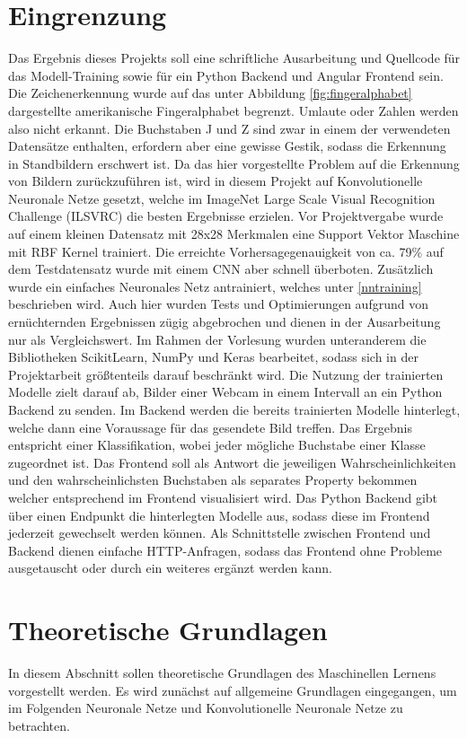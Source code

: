 \documentclass[11pt,bibliography=totocnumbered]{scrartcl}
\begin{document}
\section{Eingrenzung}
Das Ergebnis dieses Projekts soll eine schriftliche Ausarbeitung und Quellcode für das Modell-Training sowie für ein Python Backend und Angular Frontend sein. Die Zeichenerkennung wurde auf das unter Abbildung \ref{fig:fingeralphabet} dargestellte amerikanische Fingeralphabet begrenzt. Umlaute oder Zahlen werden also nicht erkannt. Die Buchstaben J und Z sind zwar in einem der verwendeten Datensätze enthalten, erfordern aber eine gewisse Gestik, sodass die Erkennung in Standbildern erschwert ist. Da das hier vorgestellte Problem auf die Erkennung von Bildern zurückzuführen ist, wird in diesem Projekt auf Konvolutionelle Neuronale Netze gesetzt, welche im ImageNet Large Scale Visual Recognition Challenge (ILSVRC) die besten Ergebnisse erzielen. Vor Projektvergabe wurde auf einem kleinen Datensatz mit 28x28 Merkmalen eine Support Vektor Maschine mit RBF Kernel trainiert. Die erreichte Vorhersagegenauigkeit von ca. 79\% auf dem Testdatensatz wurde mit einem CNN aber schnell überboten. Zusätzlich wurde ein einfaches Neuronales Netz antrainiert, welches unter \ref{nntraining} beschrieben wird. Auch hier wurden Tests und Optimierungen aufgrund von ernüchternden Ergebnissen zügig abgebrochen und dienen in der Ausarbeitung nur als Vergleichswert. Im Rahmen der Vorlesung wurden unteranderem die Bibliotheken ScikitLearn, NumPy und Keras bearbeitet, sodass sich in der Projektarbeit größtenteils darauf beschränkt wird.  Die Nutzung der trainierten Modelle zielt darauf ab, Bilder einer Webcam in einem Intervall an ein Python Backend zu senden. Im Backend werden die bereits trainierten Modelle hinterlegt, welche dann eine Voraussage für das gesendete Bild treffen. Das Ergebnis entspricht einer Klassifikation, wobei jeder mögliche Buchstabe einer Klasse zugeordnet ist. Das Frontend soll als Antwort die jeweiligen Wahrscheinlichkeiten und den wahrscheinlichsten Buchstaben als separates Property bekommen welcher entsprechend im Frontend visualisiert wird. Das Python Backend gibt über einen Endpunkt die hinterlegten Modelle aus, sodass diese im Frontend jederzeit gewechselt werden können. Als Schnittstelle zwischen Frontend und Backend dienen einfache HTTP-Anfragen, sodass das Frontend ohne Probleme ausgetauscht oder durch ein weiteres ergänzt werden kann.
\section{Theoretische Grundlagen}
In diesem Abschnitt sollen theoretische Grundlagen des Maschinellen Lernens vorgestellt werden. Es wird zunächst auf allgemeine Grundlagen eingegangen, um im Folgenden Neuronale Netze und Konvolutionelle Neuronale Netze zu betrachten.
\end{document}
